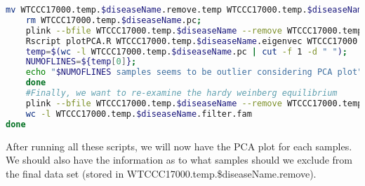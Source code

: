 \documentclass[12pt]{article}
\begin{document}
\begin{lstlisting}[language=bash]
	mv WTCCC17000.temp.$diseaseName.remove.temp WTCCC17000.temp.$diseaseName.remove;
	rm WTCCC17000.temp.$diseaseName.pc;
	plink --bfile WTCCC17000.temp.$diseaseName --remove WTCCC17000.temp.$diseaseName.remove --extract WTCCC17000.temp.$diseaseName.prune.in --genome --min 0.125 --threads 10 --pca --out WTCCC17000.temp.$diseaseName>/dev/null 2>&1;
	Rscript plotPCA.R WTCCC17000.temp.$diseaseName.eigenvec WTCCC17000.temp.$diseaseName>/dev/null 2>&1;
	temp=$(wc -l WTCCC17000.temp.$diseaseName.pc | cut -f 1 -d " ");
	NUMOFLINES=${temp[0]};
	echo "$NUMOFLINES samples seems to be outlier considering PCA plot";
	done		
	#Finally, we want to re-examine the hardy weinberg equilibrium
	plink --bfile WTCCC17000.temp.$diseaseName --remove WTCCC17000.temp.$diseaseName.remove --geno 0.01 --mind 0.95 --maf 0.05 --hardy --out WTCCC17000.temp.$diseaseName.filter --make-bed >/dev/null 2>&1;
	wc -l WTCCC17000.temp.$diseaseName.filter.fam
done
	\end{lstlisting}

	After running all these scripts, we will now have the PCA plot for each samples. 
	We should also have the information as to what samples should we exclude from the final data set (stored in WTCCC17000.temp.\$diseaseName.remove).
	
\end{document}
